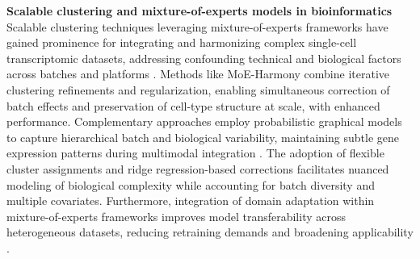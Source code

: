 \documentclass{article}
\begin{document}
\textbf{Scalable clustering and mixture-of-experts models in bioinformatics} Scalable clustering techniques leveraging mixture-of-experts frameworks have gained prominence for integrating and harmonizing complex single-cell transcriptomic datasets, addressing confounding technical and biological factors across batches and platforms \citep{Mereu2020BenchmarkingSR,Arya2025NavigatingSR}. Methods like MoE-Harmony combine iterative clustering refinements and regularization, enabling simultaneous correction of batch effects and preservation of cell-type structure at scale, with enhanced performance. Complementary approaches employ probabilistic graphical models to capture hierarchical batch and biological variability, maintaining subtle gene expression patterns during multimodal integration \citep{Squair2021PrioritizationOC,Lun2016ASW}. The adoption of flexible cluster assignments and ridge regression-based corrections facilitates nuanced modeling of biological complexity while accounting for batch diversity and multiple covariates. Furthermore, integration of domain adaptation within mixture-of-experts frameworks improves model transferability across heterogeneous datasets, reducing retraining demands and broadening applicability \citep{Mandric2020BATMANFA}.



\end{document}
